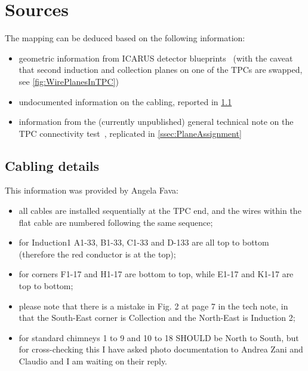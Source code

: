 \section{Sources}
\label{sec:sources}

The mapping can be deduced based on the following information:
\begin{itemize}
  \item geometric information from ICARUS detector blueprints~\cite{SBNDocDB1020}
    (with the caveat that second induction and collection planes on one of the
    TPCs are swapped, see \cref{fig:WirePlanesInTPC})
  \item undocumented information on the cabling, reported in \cref{ssec:CablingInfo}
  \item information from the (currently unpublished) general technical note
    on the TPC connectivity test~\cite{SBNDocDBxxxx:ConnTest},
    replicated in \cref{ssec:PlaneAssignment}
\end{itemize}


\subsection{Cabling details}
\label{ssec:CablingInfo}

This information was provided by Angela Fava:
\begin{itemize}
  \item all cables are installed sequentially at the TPC end, and the wires within the flat cable are numbered following the same sequence;
  \item for Induction1 A1-33, B1-33, C1-33 and D-133 are all top to bottom (therefore the red conductor is at the top);
  \item for corners F1-17 and H1-17 are bottom to top, while E1-17 and K1-17 are top to bottom;
  \item please note that there is a mistake in Fig. 2 at page 7 in the tech note, in that the South-East corner is Collection and the North-East is Induction 2;
  \item for standard chimneys 1 to 9 and 10 to 18 SHOULD be North to South, but for cross-checking this I have asked photo documentation to Andrea Zani and Claudio and I am waiting on their reply.
\end{itemize}


